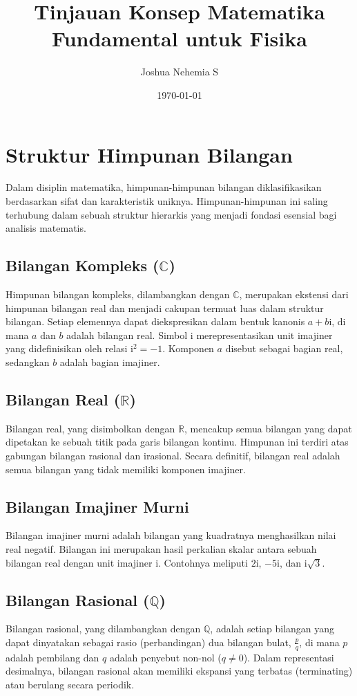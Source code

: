 \documentclass[12pt, a4paper]{article}
\title{\bf Tinjauan Konsep Matematika Fundamental untuk Fisika}
\author{Joshua Nehemia S}
\date{\today}
\newcommand{\iu}{\mathrm{i}}
\begin{document}
\maketitle
\tableofcontents
\newpage

\section{Struktur Himpunan Bilangan}
Dalam disiplin matematika, himpunan-himpunan bilangan diklasifikasikan berdasarkan sifat dan karakteristik uniknya. Himpunan-himpunan ini saling terhubung dalam sebuah struktur hierarkis yang menjadi fondasi esensial bagi analisis matematis.

\subsection{Bilangan Kompleks ($\mathbb{C}$)}
Himpunan bilangan kompleks, dilambangkan dengan $\mathbb{C}$, merupakan ekstensi dari himpunan bilangan real dan menjadi cakupan termuat luas dalam struktur bilangan. Setiap elemennya dapat diekspresikan dalam bentuk kanonis $a + b\iu$, di mana $a$ dan $b$ adalah bilangan real. Simbol $\iu$ merepresentasikan unit imajiner yang didefinisikan oleh relasi $\iu^2 = -1$. Komponen $a$ disebut sebagai bagian real, sedangkan $b$ adalah bagian imajiner.

\subsection{Bilangan Real ($\mathbb{R}$)}
Bilangan real, yang disimbolkan dengan $\mathbb{R}$, mencakup semua bilangan yang dapat dipetakan ke sebuah titik pada garis bilangan kontinu. Himpunan ini terdiri atas gabungan bilangan rasional dan irasional. Secara definitif, bilangan real adalah semua bilangan yang tidak memiliki komponen imajiner.

\subsection{Bilangan Imajiner Murni}
Bilangan imajiner murni adalah bilangan yang kuadratnya menghasilkan nilai real negatif. Bilangan ini merupakan hasil perkalian skalar antara sebuah bilangan real dengan unit imajiner $\iu$. Contohnya meliputi $2\iu$, $-5\iu$, dan $\iu\sqrt{3}$.

\subsection{Bilangan Rasional ($\mathbb{Q}$)}
Bilangan rasional, yang dilambangkan dengan $\mathbb{Q}$, adalah setiap bilangan yang dapat dinyatakan sebagai rasio (perbandingan) dua bilangan bulat, $\frac{p}{q}$, di mana $p$ adalah pembilang dan $q$ adalah penyebut non-nol ($q \neq 0$). Dalam representasi desimalnya, bilangan rasional akan memiliki ekspansi yang terbatas (terminating) atau berulang secara periodik.
\end{document}
